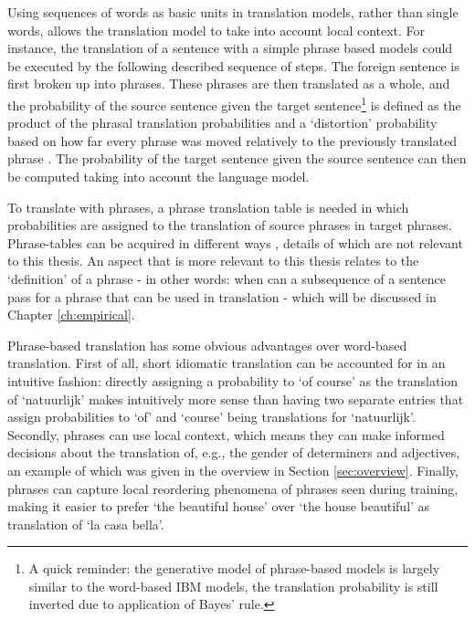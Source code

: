 \documentclass{report}
\theoremstyle{definition}
\theoremstyle{plain}
\begin{document}
Using sequences of words as basic units in translation models, rather than single words, allows the translation model to take into account local context. For instance, the translation of a sentence with a simple phrase based models could be executed by the following described sequence of steps. The foreign sentence is first broken up into phrases. These phrases are then translated as a whole, and the probability of the source sentence given the target sentence\footnote{A quick reminder: the generative model of phrase-based models is largely similar to the word-based IBM models, the translation probability is still inverted due to application of Bayes' rule.} is defined as the product of the phrasal translation probabilities and a `distortion' probability based on how far every phrase was moved relatively to the previously translated phrase \citep{koehn2003statistical}. The probability of the target sentence given the source sentence can then be computed taking into account the language model.

To translate with phrases, a phrase translation table is needed in which probabilities are assigned to the translation of source phrases in target phrases. Phrase-tables can be acquired in different ways \citep{marcu2002phrase,och1999improved,koehn2003statistical,mylonakis_simaan_emnlp_2008}, details of which are not relevant to this thesis. An aspect that is more relevant to this thesis relates to the `definition' of a phrase -  in other words: when can a subsequence of a sentence pass for a phrase that can be used in translation - which will be discussed in Chapter \ref{ch:empirical}.

Phrase-based translation has some obvious advantages over word-based translation. First of all, short idiomatic translation can be accounted for in an intuitive fashion: directly assigning a probability to `of course' as the translation of `natuurlijk' makes intuitively more sense than having two separate entries that assign probabilities to `of' and `course' being translations for `natuurlijk'. Secondly, phrases can use local context, which means they can make informed decisions about the translation of, e.g., the gender of determiners and adjectives, an example of which was given in the overview in Section \ref{sec:overview}. Finally, phrases can capture local reordering phenomena of phrases seen during training, making it easier to prefer `the beautiful house' over `the house beautiful' as translation of `la casa bella'.
\end{document}
